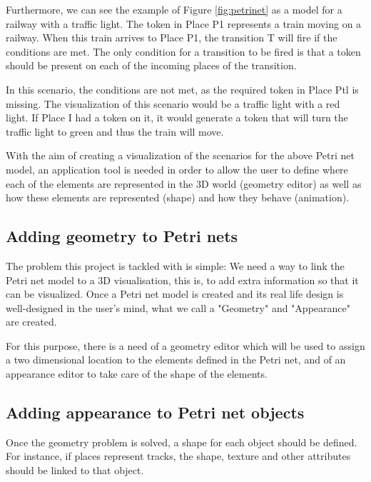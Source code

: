 Furthermore, we can see the example of Figure \ref{fig:petrinet} as a model for a railway with a traffic light. The token in Place P1 represents a train moving on a railway. When this train arrives to Place P1, the transition T will fire if the conditions are met. The only condition for a transition to be fired is that a token should be present on each of the incoming places of the transition.

In this scenario, the conditions are not met, as the required token in Place Ptl is missing. The visualization of this scenario would be a traffic light with a red light. If Place I had a token on it, it would generate a token that will turn the traffic light to green and thus the train will move. 


With the aim of creating a visualization of the scenarios for the above Petri net model, an application tool is needed in order to allow the user to define where each of the elements are represented in the 3D world (geometry editor) as well as how these elements are represented (shape) and how they behave (animation). 

\subsection{Adding geometry to Petri nets}
The problem this project is tackled with is simple: We need a way to link the Petri net model to a 3D visualisation, this is, to add extra information so that it can be visualized. Once a Petri net model is created and its real life design is well-designed in the user's mind, what we call a "Geometry" and "Appearance" are created.

For this purpose, there is a need of a geometry editor which will be used to assign a two dimensional location to the elements defined in the Petri net, and of an appearance editor to take care of the shape of the elements.

\subsection{Adding appearance to Petri net objects}
\label{sec:appearance}

Once the geometry problem is solved, a shape for each object should be defined. For instance, if places represent tracks, the shape, texture and other attributes should be linked to that object.


